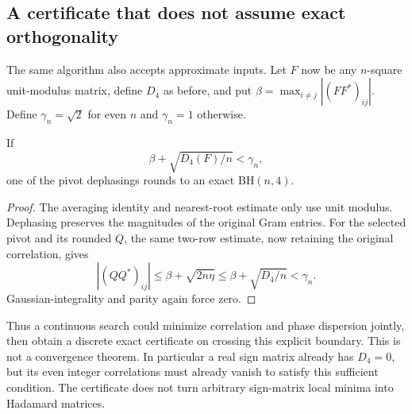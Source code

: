 \subsection{A certificate that does not assume exact orthogonality}
The same algorithm also accepts approximate inputs.
Let $F$ now be any $n$-square unit-modulus matrix, define $D_4$ as
before, and put $\beta=\max_{i\ne j}|(FF^*)_{ij}|$.
Define $\gamma_n=\sqrt2$ for even $n$ and $\gamma_n=1$ otherwise.
\begin{proposition}
If
\[
 \beta+\sqrt{D_4(F)/n}<\gamma_n,
\]
one of the pivot dephasings rounds to an exact $\mathrm{BH}(n,4)$.
\end{proposition}
\begin{proof}
The averaging identity and nearest-root estimate only use unit modulus.
Dephasing preserves the magnitudes of the original Gram entries.
For the selected pivot and its rounded $Q$, the same two-row
estimate, now retaining the original correlation, gives
\[
 |(QQ^*)_{ij}|\le\beta+\sqrt{2n\eta}
 \le\beta+\sqrt{D_4/n}<\gamma_n.
\]
Gaussian-integrality and parity again force zero.
\end{proof}
Thus a continuous search could minimize correlation and phase dispersion
jointly, then obtain a discrete exact certificate on crossing this
explicit boundary. This is not a convergence theorem. In particular a
real sign matrix already has $D_4=0$, but its even integer correlations
must already vanish to satisfy this sufficient condition. The certificate
does not turn arbitrary sign-matrix local minima into Hadamard matrices.
